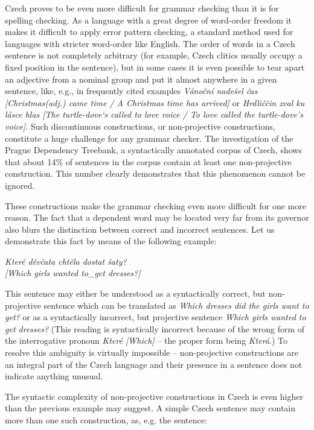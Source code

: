 \begin{multicols}{2}
Czech proves to be even more difficult for grammar checking than it is for spelling checking. As a language with a great degree of word-order freedom it makes it difficult to apply error pattern checking, a standard method used for languages with stricter word-order like English. The order of words in a Czech sentence is not completely arbitrary (for example, Czech clitics usually occupy a fixed position in the sentence), but in some cases it is even possible to tear apart an adjective from a nominal group and put it almost anywhere in a given sentence, like, e.g., in frequently cited examples \textit{Vánoční nadešel čas {[}Christmas(adj.) came time / A Christmas time has arrived{]}} or \textit{Hrdliččin zval ku lásce hlas {[}The turtle-dove‘s called to love voice / To love called the turtle-dove’s voice{]}}. Such discontinuous constructions, or non-projective constructions, constitute a huge challenge for any grammar checker. The investigation of the Prague Dependency Treebank, a syntactically annotated corpus of Czech, shows that about 14\% of sentences in the corpus contain at least one non-projective construction. This number clearly demonstrates that this phenomenon cannot be ignored.

These constructions make the grammar checking even more difficult for one more reason. The fact that a dependent word may be located very far from its governor also blurs the distinction between correct and incorrect sentences. Let us demonstrate this fact by means of the following example:

\textit{Které děvčata chtěla dostat šaty?\\
{[}Which girls wanted to\_get dresses?{]}}

This sentence may either be understood as a syntactically correct, but non-projective sentence which can be translated as \textit{Which dresses did the girls want to get?} or as a syntactically incorrect, but projective sentence \textit{Which girls wanted to get dresses?} (This reading is syntactically incorrect because of the wrong form of the interrogative pronoun \textit{Které {[}Which{]}} – the proper form being \textit{Která}.) To resolve this ambiguity is virtually impossible – non-projective constructions are an integral part of the Czech language and their presence in a sentence does not indicate anything unusual.

The syntactic complexity of non-projective constructions in Czech is even higher than the previous example may suggest. A simple Czech sentence may contain more than one such construction, as, e.g. the sentence:


\end{multicols}
